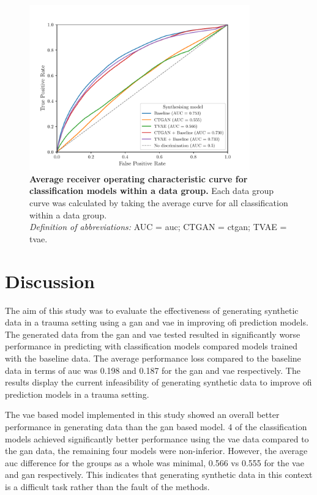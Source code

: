 \documentclass[12pt, a4paper]{article}
\begin{document}
\begin{figure}
    \centering
    \includegraphics[width=0.85\textwidth]{figures/roc.pdf}
    \caption{\textbf{Average receiver operating characteristic curve for classification models within a data group.} Each data group curve was calculated by taking the average curve for all classification within a data group. \\
        \textit{Definition of abbreviations:} AUC = \Acrlong{auc}; CTGAN = \Acrlong{ctgan}; TVAE = \Acrlong{tvae}.}
    \label{fig:roc}
\end{figure}


\section{Discussion}
The aim of this study was to evaluate the effectiveness of generating synthetic data in a trauma setting using a \acrshort{gan} and \acrshort{vae} in improving \acrshort{ofi} prediction models. The generated data from the \acrshort{gan} and \acrshort{vae} tested resulted in significantly worse performance in predicting  with classification models compared models trained with the baseline data. The average performance loss compared to the baseline data in terms of \acrshort{auc} was 0.198 and 0.187 for the \acrshort{gan} and \acrshort{vae} respectively. The results display the current infeasibility of generating synthetic data to improve \acrshort{ofi} prediction models in a trauma setting.

The \acrshort{vae} based model implemented in this study showed an overall better performance in generating data than the \acrshort{gan} based model. 4 of the classification models achieved significantly better performance using the \acrshort{vae} data compared to the \acrshort{gan} data, the remaining four models were non-inferior. However, the average \acrshort{auc} difference for the groups as a whole was minimal, 0.566 vs 0.555 for the \acrshort{vae} and \acrshort{gan} respectively. This indicates that generating synthetic data in this context is a difficult task rather than the fault of the methods.
\end{document}
